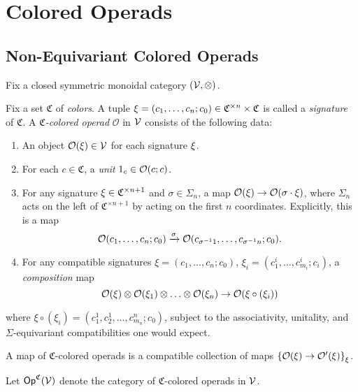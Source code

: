 \documentclass[a4paper,10pt
,draft
]{article}%
\renewcommand{\1}{\ensuremath{\mathbb{id}}}
\begin{document}
\section{Colored Operads}


\subsection{Non-Equivariant Colored Operads}

Fix a closed symmetric monoidal category $(\mathcal V, \otimes)$.

\begin{definition}
      Fix a set $\mathfrak C$ of \textit{colors}.
      A tuple
      $\xi = (c_1, \ldots, c_n; c_0) \in \mathfrak C^{\times n} \times \mathfrak C$
      is called a \textit{signature} of $\mathfrak C$.
      A \textit{$\mathfrak C$-colored operad} $\mathcal{O}$ in $\mathcal V$ consists of the following data:
      \begin{enumerate}[label = (\arabic*)]
      \item An object $\mathcal{O}(\xi) \in \mathcal V$ for each signature $\xi$.
      \item For each $c \in \mathfrak C$, a \textit{unit} $1_c \in \mathcal{O}(c;c)$.                        
      \item For any signature $\xi \in \mathfrak C^{\times n+1}$ and $\sigma \in \Sigma_n$, a map $\mathcal{O}(\xi) \to \mathcal{O}(\sigma \cdot \xi)$,
            where $\Sigma_n$ acts on the left of $\mathfrak C^{\times n+1}$ by acting on the first $n$ coordinates.
            Explicitly, this is a map
            \begin{equation}
                  \mathcal{O}(c_1, \ldots, c_n; c_0) \xrightarrow{\sigma} \mathcal{O}(c_{\sigma^{-1}1}, \ldots, c_{\sigma^{-1}n}; c_0).
            \end{equation}
      \item For any compatible signatures $\xi = (c_1, \ldots, c_n; c_0)$, $\xi_i = (c_{1}^i, \ldots, c_{m_i}^i; c_i)$, a \textit{composition} map
            \begin{equation}
                  \mathcal{O}(\xi) \otimes \mathcal{O}(\xi_1) \otimes \ldots \otimes \mathcal{O}(\xi_n) \to \mathcal{O}(\xi \circ (\xi_i))
            \end{equation}
      \end{enumerate}
      where $\xi \circ (\xi_i) = (c_1^1,c_2^1,\dots,c_{m_n}^{n}; c_0)$,
      subject to the associativity, unitality, and $\Sigma$-equivariant compatibilities one would expect.      
      
      A map of $\mathfrak C$-colored operads is a compatible collection of maps
      $\left\{\mathcal{O}(\xi) \to \mathcal{O}'(\xi)\right\}_{\xi}$.
      
      Let $\mathsf{Op}^{\mathfrak C}(\mathcal V)$ denote the category of $\mathfrak C$-colored operads in $\mathcal V$.
\end{definition}
\end{document}
